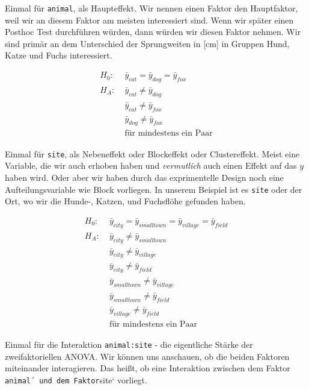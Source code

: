 \documentclass[
  letterpaper,
  DIV=11,
  oneside]{scrreport}
\begin{document}
Einmal für \texttt{animal}, als Haupteffekt. Wir nennen einen Faktor den
Hauptfaktor, weil wir an diesem Faktor am meisten interessiert sind.
Wenn wir später einen Posthoc Test durchführen würden, dann würden wir
diesen Faktor nehmen. Wir sind primär an dem Unterschied der
Sprungweiten in {[}cm{]} in Gruppen Hund, Katze und Fuchs interessiert.

\begin{align*}
H_0: &\; \bar{y}_{cat} = \bar{y}_{dog} = \bar{y}_{fox}\\
H_A: &\; \bar{y}_{cat} \ne \bar{y}_{dog}\\
\phantom{H_A:} &\; \bar{y}_{cat} \ne \bar{y}_{fox}\\
\phantom{H_A:} &\; \bar{y}_{dog} \ne \bar{y}_{fox}\\
\phantom{H_A:} &\; \mbox{für mindestens ein Paar}
\end{align*}

Einmal für \texttt{site}, als Nebeneffekt oder Blockeffekt oder
Clustereffekt. Meist eine Variable, die wir auch erhoben haben und
\emph{vermutlich} auch einen Effekt auf das \(y\) haben wird. Oder aber
wir haben durch das exprimentelle Design noch eine Aufteilungsvariable
wie Block vorliegen. In unserem Beispiel ist es \texttt{site} oder der
Ort, wo wir die Hunde-, Katzen, und Fuchsflöhe gefunden haben.

\begin{align*}
H_0: &\; \bar{y}_{city} = \bar{y}_{smalltown} = \bar{y}_{village} = \bar{y}_{field}\\
H_A: &\; \bar{y}_{city} \ne \bar{y}_{smalltown}\\
\phantom{H_A:} &\; \bar{y}_{city} \ne \bar{y}_{village}\\
\phantom{H_A:} &\; \bar{y}_{city} \ne \bar{y}_{field}\\
\phantom{H_A:} &\; \bar{y}_{smalltown} \ne \bar{y}_{village}\\
\phantom{H_A:} &\; \bar{y}_{smalltown} \ne \bar{y}_{field}\\
\phantom{H_A:} &\; \bar{y}_{village} \ne \bar{y}_{field}\\
\phantom{H_A:} &\; \mbox{für mindestens ein Paar}
\end{align*}

Einmal für die Interaktion \texttt{animal:site} - die eigentliche Stärke
der zweifaktoriellen ANOVA. Wir können uns anschauen, ob die beiden
Faktoren miteinander interagieren. Das heißt, ob eine Interaktion
zwischen dem Faktor \texttt{animal´\ und\ dem\ Faktor}site` vorliegt.
\end{document}
